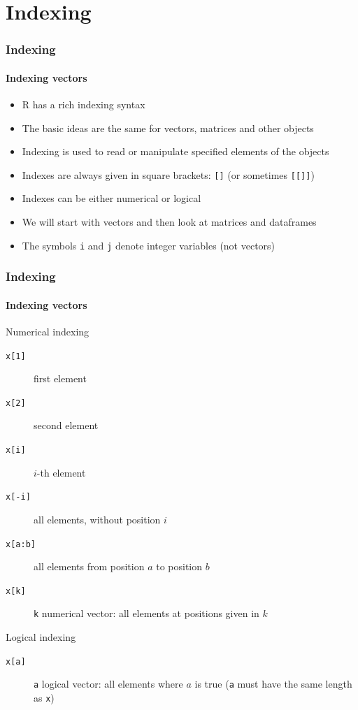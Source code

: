 \documentclass[title={Introduction to R}, author={Mutschler and Zaharieva}, inst={Institute for Econometrics and Empirical Economics}]{beamer}
\begin{document}
\section{Indexing}

\begin{frame}
\frametitle{Indexing}
\framesubtitle{Indexing vectors}
\begin{itemize}
\item R has a rich indexing syntax
\item The basic ideas are the same for vectors, matrices and other objects
\item Indexing is used to read or manipulate specified elements of the
objects
\item Indexes are always given in square brackets: \texttt{[]} \newline
(or sometimes \texttt{[[]]})
\item Indexes can be either numerical or logical
\item We will start with vectors and then look at matrices and dataframes
\item The symbols \texttt{i} and \texttt{j} denote integer variables (not
vectors)
\end{itemize}
\end{frame}


\begin{frame}
\frametitle{Indexing}
\framesubtitle{Indexing vectors}
Numerical indexing
\begin{description}
\item[{\texttt{x[1]}}] first element
\item[{\texttt{x[2]}}] second element
\item[{\texttt{x[i]}}] $i$-th element
\item[{\texttt{x[-i]}}] all elements, without position $i$
\item[{\texttt{x[a:b]}}] all elements from position $a$ to position $b$
\item[{\texttt{x[k]}}] \texttt{k} numerical vector: all elements at positions
given in $k$
\end{description}

Logical indexing
\begin{description}
\item[{\texttt{x[a]}}] \texttt{a} logical vector: all elements where $a$ is
true \newline
(\texttt{a} must have the same length as \texttt{x})
\end{description}
\end{frame}
\end{document}
